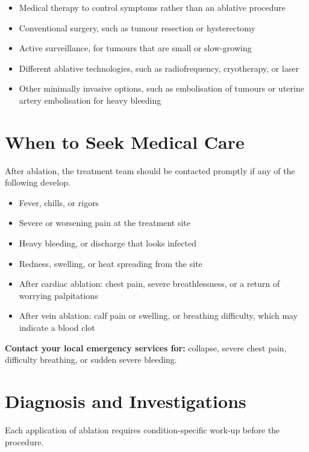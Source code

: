 \begin{itemize}
    \item Medical therapy to control symptoms rather than an ablative procedure
    \item Conventional surgery, such as tumour resection or hysterectomy
    \item Active surveillance, for tumours that are small or slow-growing
    \item Different ablative technologies, such as radiofrequency, cryotherapy, or laser
    \item Other minimally invasive options, such as embolisation of tumours or uterine artery embolisation for heavy bleeding
\end{itemize}

\section*{When to Seek Medical Care}
After ablation, the treatment team should be contacted promptly if any of the following develop.

\begin{itemize}
    \item Fever, chills, or rigors
    \item Severe or worsening pain at the treatment site
    \item Heavy bleeding, or discharge that looks infected
    \item Redness, swelling, or heat spreading from the site
    \item After cardiac ablation: chest pain, severe breathlessness, or a return of worrying palpitations
    \item After vein ablation: calf pain or swelling, or breathing difficulty, which may indicate a blood clot
\end{itemize}

\textbf{Contact your local emergency services for:} collapse, severe chest pain, difficulty breathing, or sudden severe bleeding.

\section*{Diagnosis and Investigations}
Each application of ablation requires condition-specific work-up before the procedure.

